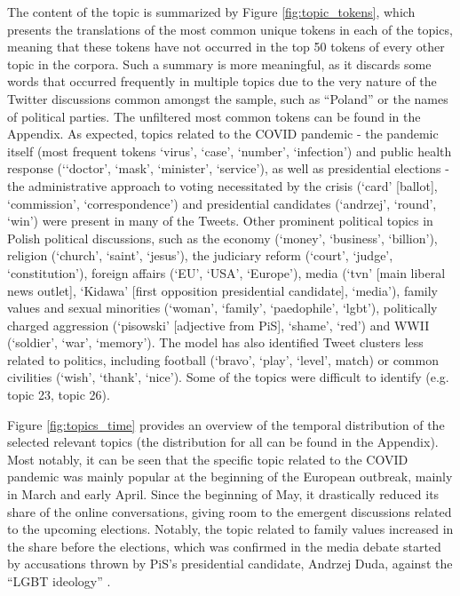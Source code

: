 \documentclass{article}
\begin{document}
	The content of the topic is summarized by Figure \ref{fig:topic_tokens}, which presents the translations of the most common unique tokens in each of the topics, meaning that these tokens have not occurred in the top 50 tokens of every other topic in the corpora. Such a summary is more meaningful, as it discards some words that occurred frequently in multiple topics due to the very nature of the Twitter discussions common amongst the sample, such as “Poland” or the names of political parties. The unfiltered most common tokens can be found in the Appendix. As expected, topics related to the COVID pandemic - the pandemic itself (most frequent tokens ‘virus’, ‘case’, ‘number’, ‘infection’) and public health response (‘‘doctor’, ‘mask’, ‘minister’, ‘service’), as well as presidential elections - the administrative approach to voting necessitated by the crisis (‘card’ [ballot], ‘commission’, ‘correspondence’) and presidential candidates (‘andrzej’, ‘round’, ‘win’) were present in many of the Tweets. Other prominent political topics in Polish political discussions, such as the economy (‘money’, ‘business’, ‘billion’), religion (‘church’, ‘saint’, ‘jesus’), the judiciary reform (‘court’, ‘judge’, ‘constitution’), foreign affairs (‘EU’, ‘USA’, ‘Europe’), media (‘tvn’ [main liberal news outlet], ‘Kidawa’ [first opposition presidential candidate], ‘media’), family values and sexual minorities (‘woman’, ‘family’, ‘paedophile’, ‘lgbt’), politically charged aggression (‘pisowski’ [adjective from PiS], ‘shame’, ‘red’) and WWII (‘soldier’, ‘war’, ‘memory’). The model has also identified Tweet clusters less related to politics, including football (‘bravo’, ‘play’, ‘level’, match) or common civilities (‘wish’, ‘thank’, ‘nice’). Some of the topics were difficult to identify (e.g. topic 23, topic 26).
	
	\clearpage
	
	Figure \ref{fig:topics_time} provides an overview of the temporal distribution of the selected relevant topics (the distribution for all can be found in the Appendix). Most notably, it can be seen that the specific topic related to the COVID pandemic was mainly popular at the beginning of the European outbreak, mainly in March and early April. Since the beginning of May, it drastically reduced its share of the online conversations, giving room to the emergent discussions related to the upcoming elections. Notably, the topic related to family values increased in the share before the elections, which was confirmed in the media debate started by accusations thrown by PiS’s presidential candidate, Andrzej Duda, against the “LGBT ideology” \citep{financial_times2020}.
	
\end{document}
